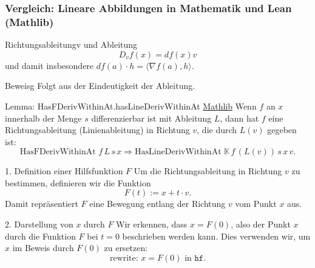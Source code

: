 \documentclass{beamer}
\begin{document}
    \begin{frame}
        \frametitle{Vergleich: Lineare Abbildungen in Mathematik und Lean (Mathlib)}
        
        
        \begin{block}{Richtungsableitungv und Ableitung}
            \[
                D_v f (x) = df(x) v
            \]
            und damit insbesondere  $df(a) \cdot h = \langle \nabla f (a) , h \rangle$.
        \end{block}

        \begin{block}{Beweisg}
            Folgt aus der Eindeutigkeit der Ableitung.
        \end{block}
    \end{frame}


 
    


    \begin{frame}
        \begin{block}{Lemma: HasFDerivWithinAt.hasLineDerivWithinAt \href{https://github.com/leanprover-community/mathlib4/blob/ef78db7e00e989f71af21dd11bcfd6b7caf560da/Mathlib/Analysis/Calculus/LineDeriv/Basic.lean\#L256-L263}{Mathlib}}
            Wenn \( f \) an \( x \) innerhalb der Menge \( s \) differenzierbar ist mit Ableitung \( L \), dann hat \( f \) eine Richtungsableitung (Linienableitung) in Richtung \( v \), die durch \( L(v) \) gegeben ist:
            \[
            \text{HasFDerivWithinAt } f \, L \, s \, x \Rightarrow \text{HasLineDerivWithinAt } \mathbb{K} \, f \, (L(v)) \, s \, x \, v.
            \]
        \end{block}
    \end{frame}
    
    \begin{frame}
        \begin{block}{1. Definition einer Hilfsfunktion \( F \)}
            Um die Richtungsableitung in Richtung \( v \) zu bestimmen, definieren wir die Funktion
            \[
            F(t) := x + t \cdot v.
            \]
            Damit repräsentiert \( F \) eine Bewegung entlang der Richtung \( v \) vom Punkt \( x \) aus.
        \end{block}
    
        \begin{block}{2. Darstellung von \( x \) durch \( F \)}
            Wir erkennen, dass \( x = F(0) \), also der Punkt \( x \) durch die Funktion \( F \) bei \( t = 0 \) beschrieben werden kann. Dies verwenden wir, um \( x \) im Beweis durch \( F(0) \) zu ersetzen:
            \[
            \text{rewrite: } x = F(0) \text{ in } \texttt{hf}.
            \]
        \end{block}
    \end{frame}
    
\end{document}
